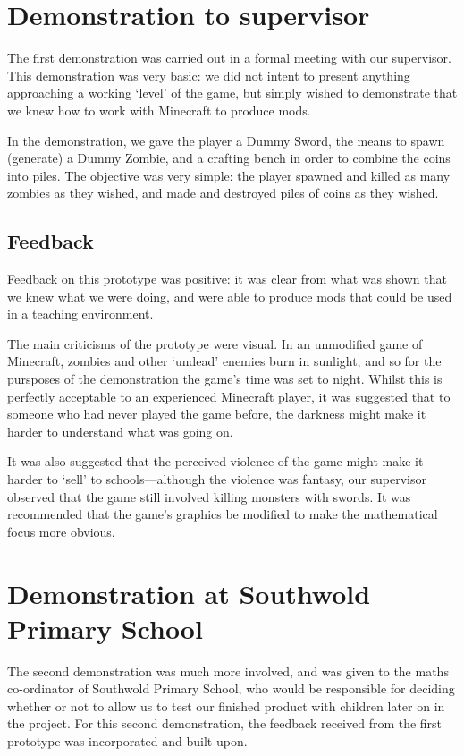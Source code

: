 \section{Demonstration to supervisor}
The first demonstration was carried out in a formal meeting with our
supervisor. This demonstration was very basic: we did not intent to present
anything approaching a working `level' of the game, but simply wished
to demonstrate that we knew how to work with Minecraft to produce mods.

In the demonstration, we gave the player a Dummy Sword, the means to spawn
(generate) a Dummy Zombie, and a crafting bench in order to combine the
coins into piles. The objective was very simple: the player spawned and
killed as many zombies as they wished, and made and destroyed piles of
coins as they wished.

\subsection{Feedback}
Feedback on this prototype was positive: it was clear from what was shown
that we knew what we were doing, and were able to produce mods that could
be used in a teaching environment.

The main criticisms of the prototype were visual. In an unmodified game of
Minecraft, zombies and other `undead' enemies burn in sunlight, and so for
the pursposes of the demonstration the game's time was set to night. Whilst
this is perfectly acceptable to an experienced Minecraft player, it was
suggested that to someone who had never played the game before, the darkness
might make it harder to understand what was going on.

It was also suggested that the perceived violence of the game might make it
harder to `sell' to schools---although the violence was fantasy, our
supervisor observed that the game still involved killing monsters with
swords. It was recommended that the game's graphics be modified to make
the mathematical focus more obvious.

\section{Demonstration at Southwold Primary School}
The second demonstration was much more involved, and was given to the
maths co-ordinator of Southwold Primary School, who would be responsible
for deciding whether or not to allow us to test our finished product
with children later on in the project. For this second demonstration, the
feedback received from the first prototype was incorporated and built upon.

